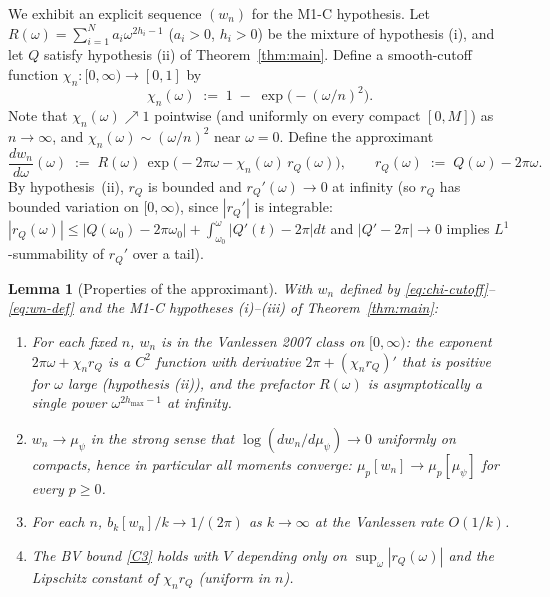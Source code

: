 \documentclass[11pt]{article}
\newtheorem{lemma}[theorem]{Lemma}
\theoremstyle{definition}
\begin{document}
We exhibit an explicit sequence $(w_n)$ for the M1-C hypothesis.  Let
$R(\omega)=\sum_{i=1}^{N} a_i\omega^{2h_i-1}$ ($a_i>0$, $h_i>0$) be
the mixture of hypothesis (i), and let $Q$ satisfy hypothesis (ii)
of Theorem~\ref{thm:main}.  Define a smooth-cutoff function
$\chi_n\colon[0,\infty)\to[0,1]$ by
\begin{equation}\label{eq:chi-cutoff}
\chi_n(\omega)\;:=\;1\;-\;\exp\bigl(-(\omega/n)^2\bigr).
\end{equation}
Note that $\chi_n(\omega)\nearrow 1$ pointwise (and uniformly on every
compact $[0,M]$) as $n\to\infty$, and $\chi_n(\omega)\sim
(\omega/n)^2$ near $\omega=0$.  Define the approximant
\begin{equation}\label{eq:wn-def}
\frac{dw_n}{d\omega}(\omega)\;:=\;
R(\omega)\,\exp\bigl(-2\pi\omega-\chi_n(\omega)\,r_Q(\omega)\bigr),
\qquad r_Q(\omega)\;:=\;Q(\omega)-2\pi\omega.
\end{equation}
By hypothesis~(ii), $r_Q$ is bounded and $r_Q'(\omega)\to 0$ at
infinity (so $r_Q$ has bounded variation on $[0,\infty)$, since
$|r_Q'|$ is integrable: $|r_Q(\omega)|\le |Q(\omega_0)-2\pi\omega_0|+
\int_{\omega_0}^\omega |Q'(t)-2\pi|dt$ and $|Q'-2\pi|\to 0$ implies
$L^1$-summability of $r_Q'$ over a tail).

\begin{lemma}[Properties of the approximant]\label{lem:wn}
With $w_n$ defined by \eqref{eq:chi-cutoff}--\eqref{eq:wn-def} and the
M1-C hypotheses (i)--(iii) of Theorem~\ref{thm:main}:
\begin{enumerate}[label=(\roman*)]
\item For each fixed $n$, $w_n$ is in the Vanlessen 2007
\cite{Vanlessen2007} class on $[0,\infty)$: the exponent
$2\pi\omega+\chi_n r_Q$ is a $C^2$ function with derivative
$2\pi+(\chi_n r_Q)'$ that is positive for $\omega$ large
(hypothesis (ii)), and the prefactor $R(\omega)$ is asymptotically a
single power $\omega^{2h_{\max}-1}$ at infinity.
\item $w_n\to\mu_\psi$ in the strong sense that $\log(dw_n/d\mu_\psi)
\to 0$ uniformly on compacts, hence in particular all moments
converge: $\mu_p[w_n]\to\mu_p[\mu_\psi]$ for every $p\ge 0$.
\item For each $n$, $b_k[w_n]/k\to 1/(2\pi)$ as $k\to\infty$ at the
Vanlessen rate $O(1/k)$.
\item The BV bound \ref{C3} holds with $V$ depending only on
$\sup_\omega |r_Q(\omega)|$ and the Lipschitz constant of $\chi_n r_Q$
(uniform in $n$).
\end{enumerate}
\end{lemma}
\end{document}
